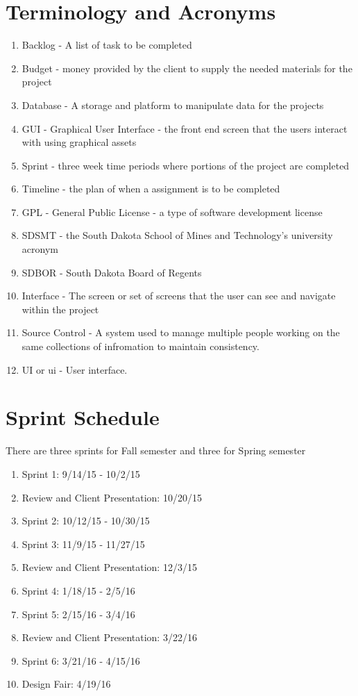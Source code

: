 \section{Terminology and Acronyms}
\begin{enumerate}
\item Backlog - A list of task to be completed
\item Budget - money provided by the client to supply the needed materials for the project
\item Database - A storage and platform to manipulate data for the projects 
\item GUI - Graphical User Interface - the front end screen that the users interact with using graphical assets
\item Sprint - three week time periods where portions of the project are completed
\item Timeline - the plan of when a assignment is to be completed
\item GPL - General Public License - a type of software development license
\item SDSMT - the South Dakota School of Mines and Technology's university acronym
\item SDBOR - South Dakota Board of Regents
\item Interface - The screen or set of screens that the user can see and navigate within the project
\item Source Control - A system used to manage multiple people working on the same collections of infromation to maintain consistency.
\item UI or ui - User interface.  
\end{enumerate}

\section{Sprint Schedule}
There are three sprints for Fall semester and three for Spring semester 
\begin{enumerate}
\item Sprint 1: 9/14/15 - 10/2/15
\item Review and Client Presentation: 10/20/15
\item Sprint 2: 10/12/15 - 10/30/15
\item Sprint 3: 11/9/15 - 11/27/15
\item Review and Client Presentation: 12/3/15
\item Sprint 4: 1/18/15 - 2/5/16
\item Sprint 5: 2/15/16 - 3/4/16
\item Review and Client Presentation: 3/22/16
\item Sprint 6: 3/21/16 - 4/15/16
\item Design Fair: 4/19/16
\end{enumerate}


